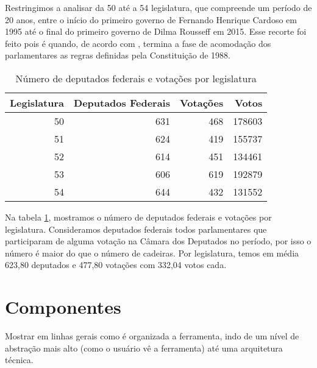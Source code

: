 Restringimos a analisar da 50\textordfeminine{} até a 54\textordfeminine{}
legislatura, que compreende um período de 20 anos, entre o início do primeiro
governo de Fernando Henrique Cardoso em 1995 até o final do primeiro governo de
Dilma Rousseff em 2015. Esse recorte foi feito pois é quando, de acordo com
\cite{Freitas2008}, termina a fase de acomodação dos parlamentares as regras
definidas pela Constituição de 1988.

\begin{table}
\centering
\begin{knitrout}
\color{fgcolor}
\begin{tabular}{r|r|r|r}
\hline
Legislatura & Deputados Federais & Votações & Votos\\
\hline
50 & 631 & 468 & 178603\\
\hline
51 & 624 & 419 & 155737\\
\hline
52 & 614 & 451 & 134461\\
\hline
53 & 606 & 619 & 192879\\
\hline
54 & 644 & 432 & 131552\\
\hline
\end{tabular}


\end{knitrout}
\caption{Número de deputados federais e votações por legislatura}
\label{table:estatisticas-legislaturas}
\end{table}

Na tabela \ref{table:estatisticas-legislaturas}, mostramos o número de
deputados federais e votações por legislatura. Consideramos deputados federais
todos parlamentares que participaram de alguma votação na Câmara dos Deputados
no período, por isso o número é maior do que o número de cadeiras. Por
legislatura, temos em média 623,80 deputados e 477,80
votações com 332,04 votos cada.

\section{Componentes}

Mostrar em linhas gerais como é organizada a ferramenta, indo de um nível de abstração mais alto (como o usuário vê a ferramenta) até uma arquitetura técnica.




